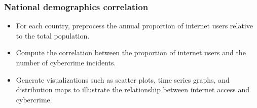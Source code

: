 	\subsubsection[]{National demographics correlation} %
		\begin{itemize}
			\item For each country, preprocess the annual proportion of internet users relative to the total population.
			\item Compute the correlation between the proportion of internet users and the number of cybercrime incidents.
			\item Generate visualizations such as scatter plots, time series graphs,
				and distribution maps to illustrate the relationship between internet access and cybercrime.
		\end{itemize}